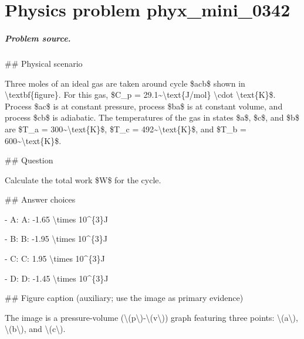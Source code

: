 
\chapter{Physics problem phyx\_mini\_0342}
\label{ch:PhyXMiniProblems_problem_phyx_mini_0342}

\paragraph{Problem source.}
\#\# Physical scenario

Three moles of an ideal gas are taken around cycle \$acb\$ shown in \textbackslash{}textbf\{figure\}. For this gas, \$C\_p = 29.1\textasciitilde{}\textbackslash{}text\{J/mol\} \textbackslash{}cdot \textbackslash{}text\{K\}\$. Process \$ac\$ is at constant pressure, process \$ba\$ is at constant volume, and process \$cb\$ is adiabatic. The temperatures of the gas in states \$a\$, \$c\$, and \$b\$ are \$T\_a = 300\textasciitilde{}\textbackslash{}text\{K\}\$, \$T\_c = 492\textasciitilde{}\textbackslash{}text\{K\}\$, and \$T\_b = 600\textasciitilde{}\textbackslash{}text\{K\}\$.

\#\# Question

Calculate the total work \$W\$ for the cycle.

\#\# Answer choices

- A: A: -1.65 \textbackslash{}times 10\textasciicircum{}\{3\}J

- B: B: -1.95 \textbackslash{}times 10\textasciicircum{}\{3\}J

- C: C: 1.95 \textbackslash{}times 10\textasciicircum{}\{3\}J

- D: D: -1.45 \textbackslash{}times 10\textasciicircum{}\{3\}J

\#\# Figure caption (auxiliary; use the image as primary evidence)

The image is a pressure-volume (\textbackslash{}(p\textbackslash{})-\textbackslash{}(v\textbackslash{})) graph featuring three points: \textbackslash{}(a\textbackslash{}), \textbackslash{}(b\textbackslash{}), and \textbackslash{}(c\textbackslash{}). 

